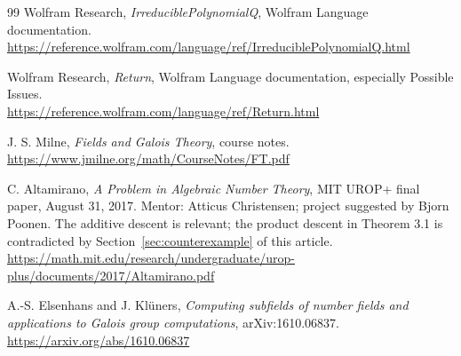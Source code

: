 \documentclass[11pt,letterpaper]{article}
\theoremstyle{definition}\newtheorem{definition}[theorem]{Definition}
\theoremstyle{remark}\newtheorem{remark}[theorem]{Remark}
\begin{document}
\begin{thebibliography}{99}
Wolfram Research, \emph{IrreduciblePolynomialQ}, Wolfram Language documentation.\\
\url{https://reference.wolfram.com/language/ref/IrreduciblePolynomialQ.html}

Wolfram Research, \emph{Return}, Wolfram Language documentation, especially Possible Issues.\\
\url{https://reference.wolfram.com/language/ref/Return.html}

J. S. Milne, \emph{Fields and Galois Theory}, course notes.\\
\url{https://www.jmilne.org/math/CourseNotes/FT.pdf}

C. Altamirano, \emph{A Problem in Algebraic Number Theory}, MIT UROP+ final paper, August 31, 2017. Mentor: Atticus Christensen; project suggested by Bjorn Poonen. The additive descent is relevant; the product descent in Theorem 3.1 is contradicted by Section~\ref{sec:counterexample} of this article.\\
\url{https://math.mit.edu/research/undergraduate/urop-plus/documents/2017/Altamirano.pdf}

A.-S. Elsenhans and J. Kl\"uners, \emph{Computing subfields of number fields and applications to Galois group computations}, arXiv:1610.06837.\\
\url{https://arxiv.org/abs/1610.06837}
\end{thebibliography}
\end{document}
